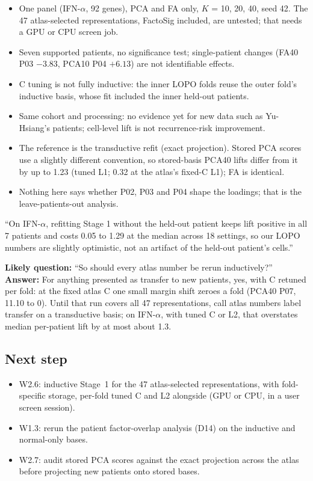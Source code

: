 \begin{caveatbox}
\begin{itemize}
\item One panel (IFN-$\alpha$, 92 genes), PCA and FA only, $K$ = 10, 20, 40, seed 42. The 47 atlas-selected representations, FactoSig included, are untested; that needs a GPU or CPU screen job.
\item Seven supported patients, no significance test; single-patient changes (FA40 P03 $-3.83$\pp, PCA10 P04 $+6.13$\pp) are not identifiable effects.
\item C tuning is not fully inductive: the inner LOPO folds reuse the outer fold's inductive basis, whose fit included the inner held-out patients.
\item Same cohort and processing: no evidence yet for new data such as Yu-Hsiang's patients; cell-level lift is not recurrence-risk improvement.
\item The reference is the transductive refit (exact projection). Stored PCA scores use a slightly different convention, so stored-basis PCA40 lifts differ from it by up to 1.23\pp{} (tuned L1; 0.32\pp{} at the atlas's fixed-C L1); FA is identical.
\item Nothing here says whether P02, P03 and P04 shape the loadings; that is the leave-patients-out analysis.
\end{itemize}
\end{caveatbox}

\begin{teambox}
``On IFN-$\alpha$, refitting Stage 1 without the held-out patient keeps lift positive in all 7 patients and costs 0.05 to 1.29\pp{} at the median across 18 settings, so our LOPO numbers are slightly optimistic, not an artifact of the held-out patient's cells.''

\textbf{Likely question:} ``So should every atlas number be rerun inductively?''\\
\textbf{Answer:} For anything presented as transfer to new patients, yes, with C retuned per fold: at the fixed atlas C one small margin shift zeroes a fold (PCA40 P07, 11.10\pp{} to 0). Until that run covers all 47 representations, call atlas numbers label transfer on a transductive basis; on IFN-$\alpha$, with tuned C or L2, that overstates median per-patient lift by at most about 1.3\pp.
\end{teambox}

\subsection*{Next step}
\begin{itemize}
\item W2.6: inductive Stage~1 for the 47 atlas-selected representations, with fold-specific storage, per-fold tuned C and L2 alongside (GPU or CPU, in a user screen session).
\item W1.3: rerun the patient factor-overlap analysis (D14) on the inductive and normal-only bases.
\item W2.7: audit stored PCA scores against the exact projection across the atlas before projecting new patients onto stored bases.
\end{itemize}

